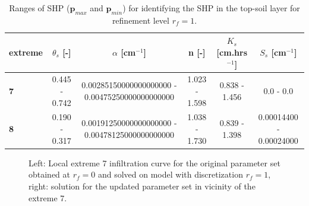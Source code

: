 \documentclass[review,times,3p,10pt]{elsarticle}
\renewcommand{\vec}{\mathbf}
\newcommand{\fs}{\footnotesize}
\begin{document}
\begin{table}[ht]
\begin{center}
\caption{Ranges of SHP ($\vec{p}_{max}$ and $\vec{p}_{min}$) for identifying the SHP in the top-soil layer for { refinement level} $r_f=1$. }
\fs
\begin{tabular}{ l || c | c| c| c |c}
\toprule
extreme & $\theta_s$ [-]&$\alpha$ [cm$^{-1}$]&n [-]& $K_s$ [cm.hrs$^{-1}$]  & $S_s$ [cm$^{-1}$] \\ \hline
\toprule
{\bf 7} & 0.445 - 0.742 & \num{.00285150000000000000} - \num{.00475250000000000000} & 1.023 - 1.598 & 0.838 - 1.456 & 0.0 - 0.0 \\
{\bf 8} & 0.190 - 0.317 & \num{.00191250000000000000} - \num{.00478125000000000000} & 1.038 - 1.730 & 0.839 - 1.398 &  \num{.00014400} - \num{.00024000} \\
\toprule
\end{tabular}
\label{rozsahy2}
\end{center}
\end{table}



\begin{figure}
\caption{Left: Local extreme 7 infiltration curve for the original parameter set obtained at $r_f=0$ and solved on model with discretization $r_f=1$, right: solution for the updated parameter set in  vicinity of the extreme 7.}
\label{rf1examples}
\end{figure}
\end{document}
